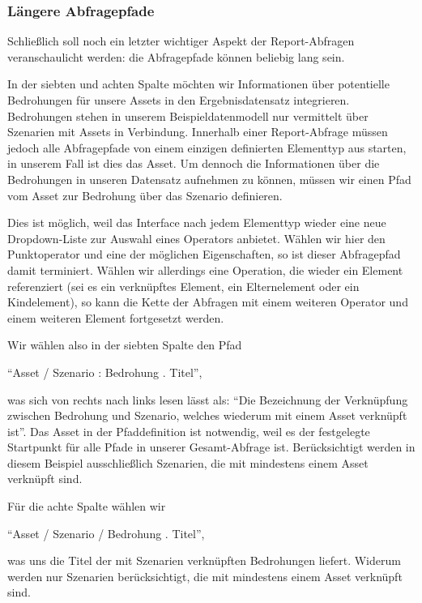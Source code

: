 \documentclass[a4paper,10pt]{book}
\begin{document}
\subsubsection{Längere Abfragepfade}\label{luxe4ngere-abfragepfade}

Schließlich soll noch ein letzter wichtiger Aspekt der Report-Abfragen
veranschaulicht werden: die Abfragepfade können beliebig lang sein.

In der siebten und achten Spalte möchten wir Informationen über potentielle
Bedrohungen für unsere Assets in den Ergebnisdatensatz integrieren. Bedrohungen
stehen in unserem Beispieldatenmodell nur vermittelt über Szenarien mit Assets
in Verbindung. Innerhalb einer Report-Abfrage müssen jedoch alle Abfragepfade
von einem einzigen definierten Elementtyp aus starten, in unserem Fall ist dies
das Asset. Um dennoch die Informationen über die Bedrohungen in unseren
Datensatz aufnehmen zu können, müssen wir einen Pfad vom Asset zur Bedrohung
über das Szenario definieren.

Dies ist möglich, weil das Interface nach jedem Elementtyp wieder eine neue
Dropdown-Liste zur Auswahl eines Operators anbietet. Wählen wir hier den
Punktoperator und eine der möglichen Eigenschaften, so ist dieser Abfragepfad
damit terminiert. Wählen wir allerdings eine Operation, die wieder ein Element
referenziert (sei es ein verknüpftes Element, ein Elternelement oder ein
Kindelement), so kann die Kette der Abfragen mit einem weiteren Operator und
einem weiteren Element fortgesetzt werden.

Wir wählen also in der siebten Spalte den Pfad

``Asset / Szenario : Bedrohung . Titel'',

was sich von rechts nach links lesen lässt als: ``Die Bezeichnung der
Verknüpfung zwischen Bedrohung und Szenario, welches wiederum mit einem Asset
verknüpft ist''. Das Asset in der Pfaddefinition ist notwendig, weil es der
festgelegte Startpunkt für alle Pfade in unserer Gesamt-Abfrage ist.
Berücksichtigt werden in diesem Beispiel ausschließlich Szenarien, die mit
mindestens einem Asset verknüpft sind.

Für die achte Spalte wählen wir

``Asset / Szenario / Bedrohung . Titel'',

was uns die Titel der mit Szenarien verknüpften Bedrohungen liefert. Widerum
werden nur Szenarien berücksichtigt, die mit mindestens einem Asset verknüpft
sind.
\end{document}
